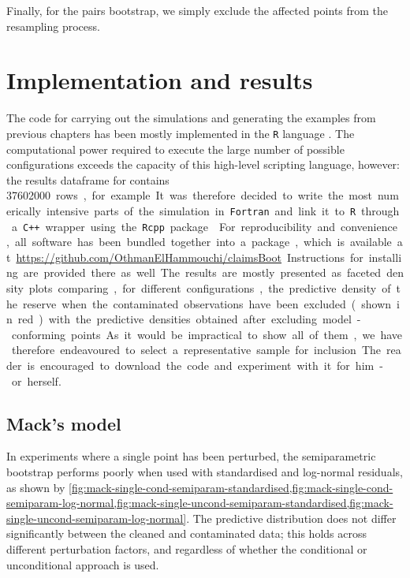 \documentclass[a4paper]{book}
\begin{document}
Finally, for the pairs bootstrap, we simply exclude the affected points from the resampling process.

\section{Implementation and results}

The code for carrying out the simulations and generating the examples from previous chapters has been mostly implemented in the \texttt{R} language \cite{R}. The computational power required to execute the large number of possible configurations exceeds the capacity of this high-level scripting language, however: the results dataframe for  contains \SI{37602000} rows, for example. It was therefore decided to write the most numerically intensive parts of the simulation in \texttt{Fortran} and link it to \texttt{R} through a \texttt{C++} wrapper using the \texttt{Rcpp} package \cite{eddelbuettel}. For reproducibility and convenience, all software has been bundled together into a package, which is available at \url{https://github.com/OthmanElHammouchi/claimsBoot}. Instructions for installing are provided there as well.

The results are mostly presented as faceted density plots comparing, for different configurations, the predictive density of the reserve when the contaminated observations have been excluded (shown in red) with the predictive densities obtained after excluding model-conforming points. As it would be impractical to show all of them, we have therefore endeavoured to select a representative sample for inclusion. The reader is encouraged to download the code and experiment with it for him- or herself.

\subsection{Mack's model} \label{subsec:mack-sim-res}

In experiments where a single point has been perturbed, the semiparametric bootstrap performs poorly when used with standardised and log-normal residuals, as shown by \cref{fig:mack-single-cond-semiparam-standardised,fig:mack-single-cond-semiparam-log-normal,fig:mack-single-uncond-semiparam-standardised,fig:mack-single-uncond-semiparam-log-normal}. The predictive distribution does not differ significantly between the cleaned and contaminated data; this holds across different perturbation factors, and regardless of whether the conditional or unconditional approach is used.
\end{document}
